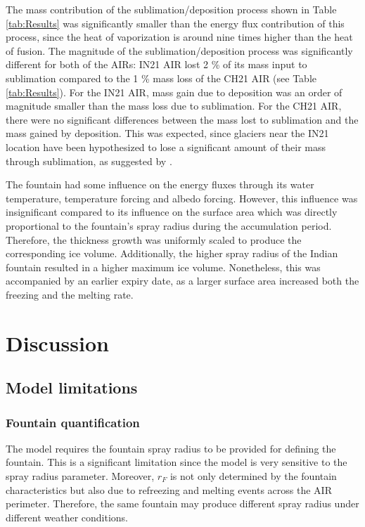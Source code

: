 \documentclass[utf8]{frontiersSCNS}
\begin{document}
The mass contribution of the sublimation/deposition process shown in Table \ref{tab:Results} was significantly
smaller than the energy flux contribution of this process, since the heat of vaporization is around nine times
higher than the heat of fusion. The magnitude of the sublimation/deposition process was significantly different
for both of the AIRs:  IN21 AIR lost 2 \% of its mass input to sublimation compared to the 1 \% mass loss of the
CH21 AIR (see Table \ref{tab:Results}). For the IN21 AIR, mass gain due to deposition was an order of magnitude
smaller than the mass loss due to sublimation. For the CH21 AIR, there were no significant differences between
the mass lost to sublimation and the mass gained by deposition. This was expected, since glaciers near the IN21
location have been hypothesized to lose a significant amount of their mass through sublimation, as suggested by
\cite{azam_2018}.

The fountain had some influence on the energy fluxes through its water temperature, temperature forcing and
albedo forcing. However, this influence was insignificant compared to its influence on the surface area which
was directly proportional to the fountain's spray radius during the accumulation period. Therefore, the
thickness growth was uniformly scaled to produce the corresponding ice volume. Additionally, the higher spray
radius of the Indian fountain resulted in a higher maximum ice volume. Nonetheless, this was accompanied by an
earlier expiry date, as a larger surface area increased both the freezing and the melting rate.

\section{Discussion}

\subsection{Model limitations}
\subsubsection{Fountain quantification}

The model requires the fountain spray radius to be provided for defining the fountain. This is a significant
limitation since the model is very sensitive to the spray radius parameter. Moreover, $r_F$ is not only
determined by the fountain characteristics but also due to refreezing and melting events across the AIR
perimeter. Therefore, the same fountain may produce different spray radius under different weather conditions.
\end{document}
